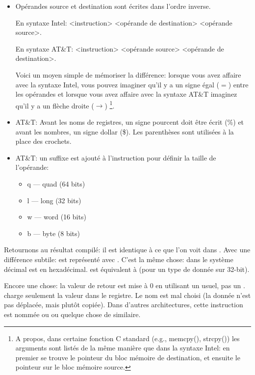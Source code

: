 \begin{itemize}

\item
Opérandes source et destination sont écrites dans l'ordre inverse.

En syntaxe Intel: <instruction> <opérande de destination> <opérande source>.

En syntaxe AT\&T: <instruction> <opérande source> <opérande de destination>.

Voici un moyen simple de mémoriser la différence:
lorsque vous avez affaire avec la syntaxe Intel, vous pouvez imaginer qu'il y a un signe
égal ($=$) entre les opérandes et lorsque vous avez affaire avec la syntaxe AT\&T imaginez
qu'il y a un flèche droite ($\rightarrow$)
\footnote{A propos, dans certaine fonction C standard (e.g., memcpy(), strcpy()) les arguments
sont listés de la même manière que dans la syntaxe Intel: en premier se trouve le pointeur du
bloc mémoire de destination, et ensuite le pointeur sur le bloc mémoire source.}.

\item
AT\&T: Avant les noms de registres, un signe pourcent doit être écrit (\%) et avant les nombres, un signe dollar (\$).
Les parenthèses sont utilisées à la place des crochets.

\item
AT\&T: un suffixe est ajouté à l'instruction pour définir la taille de l'opérande:

\begin{itemize}
\item q --- quad (64 bits)
\item l --- long (32 bits)
\item w --- word (16 bits)
\item b --- byte (8 bits)
\end{itemize}


\end{itemize}

Retournons au résultat compilé: il est identique à ce que l'on voit dans \IDA.
Avec une différence subtile:  est représenté avec .
C'est la même chose:  dans le système décimal est  en hexadécimal.
 est équivalent à  (pour un type de donnée sur 32-bit).

Encore une chose: la valeur de retour est mise à 0 en utilisant un \MOV usuel, pas un \XOR.
\MOV charge seulement la valeur dans le registre.
Le nom est mal choisi (la donnée n'est pas déplacée, mais plutôt copiée). Dans d'autres architectures, cette instruction
est nommée  ou  ou quelque chose de similaire.

